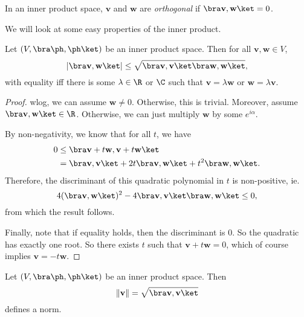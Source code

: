\documentclass[a4paper]{article}
\begin{document}
\begin{defi}[Orthogonality]
  In an inner product space, $\mathbf{v}$ and $\mathbf{w}$ are \emph{orthogonal} if $\bra \mathbf{v}, \mathbf{w} \ket = 0$.
\end{defi}

We will look at some easy properties of the inner product.
\begin{prop}
  Let $(V, \bra \ph,\ph\ket)$ be an inner product space. Then for all $\mathbf{v}, \mathbf{w} \in V$,
  \[
    |\bra \mathbf{v}, \mathbf{w}\ket| \leq \sqrt{\bra \mathbf{v}, \mathbf{v}\ket \bra \mathbf{w}, \mathbf{w}\ket},
  \]
  with equality iff there is some $\lambda \in \R$ or $\C$ such that $\mathbf{v} = \lambda \mathbf{w}$ or $\mathbf{w} = \lambda \mathbf{v}$.
\end{prop}

\begin{proof}
  wlog, we can assume $\mathbf{w} \not= 0$. Otherwise, this is trivial. Moreover, assume $\bra \mathbf{v}, \mathbf{w}\ket \in \R$. Otherwise, we can just multiply $\mathbf{w}$ by some $e^{i\alpha}$.

  By non-negativity, we know that for all $t$, we have
  \begin{align*}
    0 &\leq \bra \mathbf{v} + t\mathbf{w}, \mathbf{v} + t\mathbf{w}\ket\\
    &= \bra \mathbf{v}, \mathbf{v}\ket + 2t\bra \mathbf{v}, \mathbf{w}\ket + t^2 \bra \mathbf{w}, \mathbf{w}\ket.
  \end{align*}
  Therefore, the discriminant of this quadratic polynomial in $t$ is non-positive, ie.
  \[
    4(\bra \mathbf{v}, \mathbf{w}\ket)^2 - 4\bra \mathbf{v}, \mathbf{v}\ket \bra \mathbf{w}, \mathbf{w}\ket \leq 0,
  \]
  from which the result follows.

  Finally, note that if equality holds, then the discriminant is $0$. So the quadratic has exactly one root. So there exists $t$ such that $\mathbf{v} + t\mathbf{w} = 0$, which of course implies $\mathbf{v} = -t\mathbf{w}$.
\end{proof}

\begin{prop}
  Let $(V, \bra \ph, \ph\ket)$ be an inner product space. Then
  \[
    \|\mathbf{v}\| = \sqrt{\bra \mathbf{v}, \mathbf{v}\ket}
  \]
  defines a norm.
\end{prop}
\end{document}
